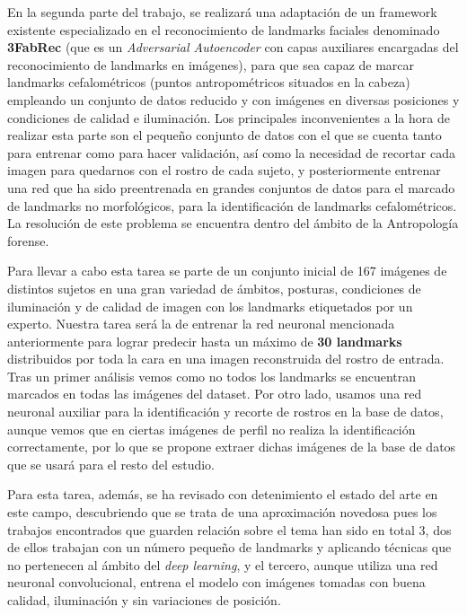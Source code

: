 \medskip

\noindent En la segunda parte del trabajo, se realizará una adaptación de un framework existente especializado en el reconocimiento de landmarks faciales denominado \textbf{3FabRec} (que es un \textit{Adversarial Autoencoder} con capas auxiliares encargadas del reconocimiento de landmarks en imágenes), para que sea capaz de marcar landmarks cefalométricos (puntos antropométricos situados en la cabeza) empleando un conjunto de datos reducido y con imágenes en diversas posiciones y condiciones de calidad e iluminación. Los principales inconvenientes a la hora de realizar esta parte son el pequeño conjunto de datos con el que se cuenta tanto para entrenar como para hacer validación, así como la necesidad de recortar cada imagen para quedarnos con el rostro de cada sujeto, y posteriormente entrenar una red que ha sido preentrenada en grandes conjuntos de datos para el marcado de landmarks no morfológicos, para la identificación de landmarks cefalométricos. La resolución de este problema se encuentra dentro del ámbito de la Antropología forense.

\medskip

\noindent Para llevar a cabo esta tarea se parte de un conjunto inicial de 167 imágenes de distintos sujetos en una gran variedad de ámbitos, posturas, condiciones de iluminación y de calidad de imagen con los landmarks etiquetados por un experto.  Nuestra tarea será la de entrenar la red neuronal mencionada anteriormente para lograr predecir hasta un máximo de \textbf{30 landmarks} distribuidos por toda la cara en una imagen reconstruida del rostro de entrada. Tras un primer análisis vemos como no todos los landmarks se encuentran marcados en todas las imágenes del dataset. Por otro lado, usamos una red neuronal auxiliar para la identificación y recorte de rostros en la base de datos, aunque vemos que en ciertas imágenes de perfil no realiza la identificación correctamente, por lo que se propone extraer dichas imágenes de la base de datos que se usará para el resto del estudio. 

\medskip

\noindent Para esta tarea, además, se ha revisado con detenimiento el estado del arte en este campo, descubriendo que se trata de una aproximación novedosa pues los trabajos encontrados que guarden relación sobre el tema han sido en total 3, dos de ellos trabajan con un número pequeño de landmarks y aplicando técnicas que no pertenecen al ámbito del \textit{deep learning}, y el tercero, aunque utiliza una red neuronal convolucional, entrena el modelo con imágenes tomadas con buena calidad, iluminación y sin variaciones de posición.


